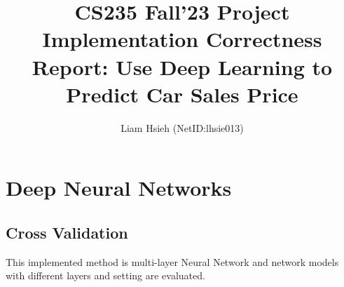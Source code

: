 \documentclass[manuscript,screen,review]{acmart}
\begin{document}
\title{CS235 Fall'23 Project Implementation Correctness Report: Use Deep Learning to Predict Car Sales Price}

\author{Liam Hsieh (NetID:lhsie013)}
\affiliation{%
}

\renewcommand{\shortauthors}{Liam Y. Hsieh}




\maketitle


\section{Deep Neural Networks}

\subsection{Cross Validation}

This implemented method is multi-layer Neural Network and network models with different layers and setting are evaluated. 
\end{document}
